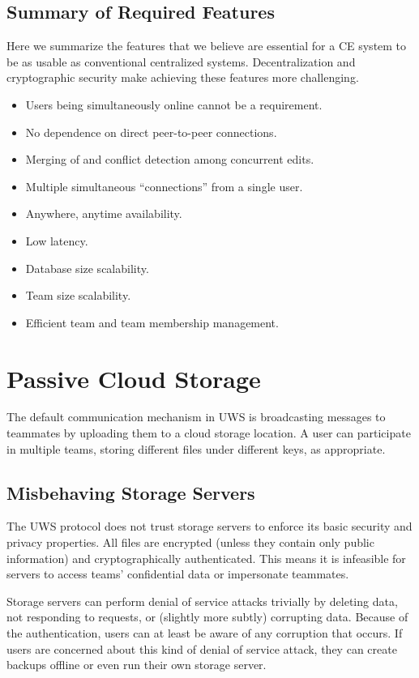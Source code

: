 \documentclass[runningheads]{llncs}
\begin{document}
\subsection{Summary of Required Features}

Here we summarize the features that we believe are essential for a CE system to be as usable as conventional centralized systems.
Decentralization and cryptographic security make achieving these features more challenging.

\begin{itemize}
\item Users being simultaneously online cannot be a requirement.
\item No dependence on direct peer-to-peer connections.
\item Merging of and conflict detection among concurrent edits.
\item Multiple simultaneous ``connections'' from a single user.
\item Anywhere, anytime availability.
\item Low latency.
\item Database size scalability.
\item Team size scalability.
\item Efficient team and team membership management.
\end{itemize}

\section{Passive Cloud Storage}


The default communication mechanism in UWS is broadcasting messages to teammates by uploading them to a cloud storage location.
A user can participate in multiple teams, storing different files under different keys, as appropriate.

\subsection{Misbehaving Storage Servers}

The UWS protocol does not trust storage servers to enforce its basic security and privacy properties.
All files are encrypted (unless they contain only public information) and cryptographically authenticated.
This means it is infeasible for servers to access teams' confidential data or impersonate teammates.

Storage servers can perform denial of service attacks trivially by deleting data, not responding to requests, or (slightly more subtly) corrupting data.
Because of the authentication, users can at least be aware of any corruption that occurs.
If users are concerned about this kind of denial of service attack, they can create backups offline or even run their own storage server.
\end{document}
